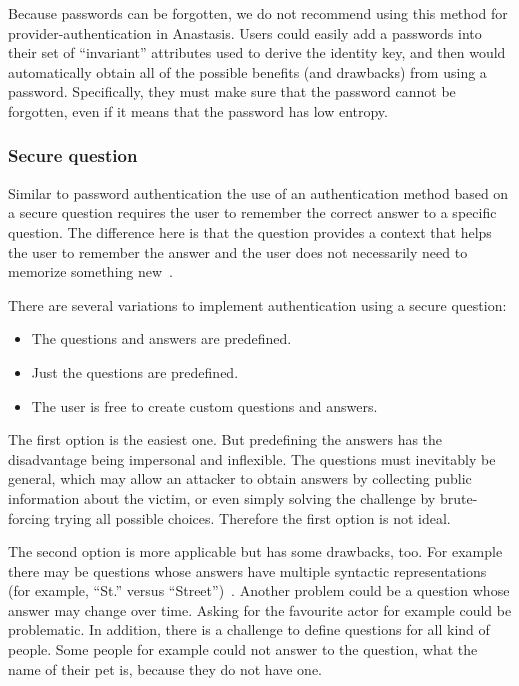 Because passwords can be forgotten, we do not recommend using this
method for provider-authentication in Anastasis. Users could easily
add a passwords into their set of ``invariant'' attributes used to
derive the identity key, and then would automatically obtain all of
the possible benefits (and drawbacks) from using a password.
Specifically, they must make sure that the password cannot be
forgotten, even if it means that the password has low entropy.

\subsubsection{Secure question}

Similar to password authentication the use of an authentication method
based on a secure question requires the user to remember the correct
answer to a specific question. The difference here is that the
question provides a context that helps the user to remember the answer
and the user does not necessarily need to memorize something
new~\cite{just2004}.

There are several variations to implement authentication using a
secure question:

\begin{itemize}
 \item The questions and answers are predefined.
 \item Just the questions are predefined.
 \item The user is free to create custom questions and answers.
\end{itemize}

The first option is the easiest one. But predefining the answers has
the disadvantage being impersonal and inflexible. The questions must
inevitably be general, which may allow an attacker to obtain answers
by collecting public information about the victim, or even simply
solving the challenge by brute-forcing trying all possible choices.
Therefore the first option is not ideal.

The second option is more applicable but has some drawbacks, too. For
example there may be questions whose answers have multiple syntactic
representations (for example, ``St.'' versus
``Street'')~\cite{just2004}. Another problem could be a question whose
answer may change over time. Asking for the favourite actor for
example could be problematic. In addition, there is a challenge to
define questions for all kind of people. Some people for example could
not answer to the question, what the name of their pet is, because
they do not have one.

